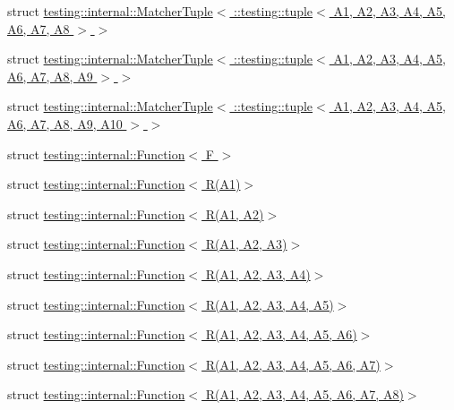 \begin{DoxyCompactItemize}
\item 
struct \hyperlink{structtesting_1_1internal_1_1_matcher_tuple_3_01_1_1testing_1_1tuple_3_01_a1_00_01_a2_00_01_a3_0d8930d50f28e62c202d0bf6b34d01eac}{testing\+::internal\+::\+Matcher\+Tuple$<$ \+::testing\+::tuple$<$ A1, A2, A3, A4, A5, A6, A7, A8 $>$ $>$}
\item 
struct \hyperlink{structtesting_1_1internal_1_1_matcher_tuple_3_01_1_1testing_1_1tuple_3_01_a1_00_01_a2_00_01_a3_05ce0d9708ffc0cc1f9fec180f9f8202e}{testing\+::internal\+::\+Matcher\+Tuple$<$ \+::testing\+::tuple$<$ A1, A2, A3, A4, A5, A6, A7, A8, A9 $>$ $>$}
\item 
struct \hyperlink{structtesting_1_1internal_1_1_matcher_tuple_3_01_1_1testing_1_1tuple_3_01_a1_00_01_a2_00_01_a3_0842d32b3c1d00aa4e42fe38fbc4fa689}{testing\+::internal\+::\+Matcher\+Tuple$<$ \+::testing\+::tuple$<$ A1, A2, A3, A4, A5, A6, A7, A8, A9, A10 $>$ $>$}
\item 
struct \hyperlink{structtesting_1_1internal_1_1_function}{testing\+::internal\+::\+Function$<$ F $>$}
\item 
struct \hyperlink{structtesting_1_1internal_1_1_function_3_01_r_07_a1_08_4}{testing\+::internal\+::\+Function$<$ R(\+A1)$>$}
\item 
struct \hyperlink{structtesting_1_1internal_1_1_function_3_01_r_07_a1_00_01_a2_08_4}{testing\+::internal\+::\+Function$<$ R(\+A1, A2)$>$}
\item 
struct \hyperlink{structtesting_1_1internal_1_1_function_3_01_r_07_a1_00_01_a2_00_01_a3_08_4}{testing\+::internal\+::\+Function$<$ R(\+A1, A2, A3)$>$}
\item 
struct \hyperlink{structtesting_1_1internal_1_1_function_3_01_r_07_a1_00_01_a2_00_01_a3_00_01_a4_08_4}{testing\+::internal\+::\+Function$<$ R(\+A1, A2, A3, A4)$>$}
\item 
struct \hyperlink{structtesting_1_1internal_1_1_function_3_01_r_07_a1_00_01_a2_00_01_a3_00_01_a4_00_01_a5_08_4}{testing\+::internal\+::\+Function$<$ R(\+A1, A2, A3, A4, A5)$>$}
\item 
struct \hyperlink{structtesting_1_1internal_1_1_function_3_01_r_07_a1_00_01_a2_00_01_a3_00_01_a4_00_01_a5_00_01_a6_08_4}{testing\+::internal\+::\+Function$<$ R(\+A1, A2, A3, A4, A5, A6)$>$}
\item 
struct \hyperlink{structtesting_1_1internal_1_1_function_3_01_r_07_a1_00_01_a2_00_01_a3_00_01_a4_00_01_a5_00_01_a6_00_01_a7_08_4}{testing\+::internal\+::\+Function$<$ R(\+A1, A2, A3, A4, A5, A6, A7)$>$}
\item 
struct \hyperlink{structtesting_1_1internal_1_1_function_3_01_r_07_a1_00_01_a2_00_01_a3_00_01_a4_00_01_a5_00_01_a6_00_01_a7_00_01_a8_08_4}{testing\+::internal\+::\+Function$<$ R(\+A1, A2, A3, A4, A5, A6, A7, A8)$>$}

\end{DoxyCompactItemize}
